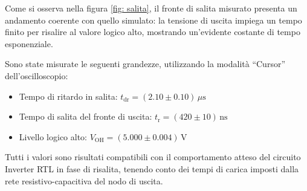 \documentclass[a4paper,12pt]{article}
\begin{document}
Come si osserva nella figura \ref{fig: salita}, il fronte di salita misurato presenta un andamento coerente con quello simulato: la tensione di uscita impiega un tempo finito per risalire al valore logico alto, mostrando un’evidente costante di tempo esponenziale.

Sono state misurate le seguenti grandezze, utilizzando la modalità “Cursor” dell’oscilloscopio:

\begin{itemize}
  \item Tempo di ritardo in salita: \(t_{\text{dr}} = (2.10 \pm 0.10)\,\mu\mathrm{s}\)
  \item Tempo di salita del fronte di uscita: \(t_{\text{r}} = (420 \pm 10)\,\mathrm{ns}\)
  \item Livello logico alto: \(V_{\text{OH}} = (5.000 \pm 0.004)\,\mathrm{V}\)
\end{itemize}

Tutti i valori sono risultati compatibili con il comportamento atteso del circuito Inverter RTL in fase di risalita, tenendo conto dei tempi di carica imposti dalla rete resistivo-capacitiva del nodo di uscita.





\end{document}
